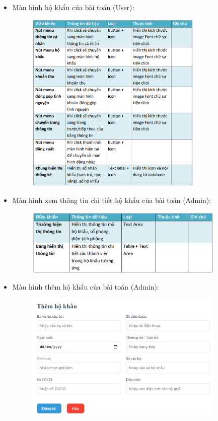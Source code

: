 \documentclass{article}
\begin{document}
\begin{itemize}
\begin{figure}[H]
    \end{figure}
    \item Màn hình hộ khẩu của bài toán (User):
    \begin{figure}[H]
        \centering
        \includegraphics[width=0.8\textwidth]{Ảnh chương 4/Hộ khẩu User 1.png}
    \end{figure}
    \vspace{4cm}
    \item Màn hình xem thông tin chi tiết hộ khẩu của bài toán (Admin):
    \begin{figure}[H]
        \centering
        \includegraphics[width=0.9\textwidth]{Ảnh chương 4/Thông tin hộ khẩu Admin 1.png}
    \end{figure}
    \item Màn hình thêm hộ khẩu của bài toán (Admin):
    \begin{figure}[H]
        \centering
        \includegraphics[width=0.9\textwidth]{Ảnh chương 4/Thêm hộ khẩu 1.png}

\end{figure}
\end{itemize}
\end{document}
